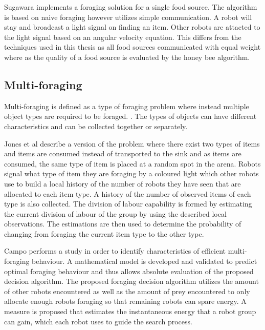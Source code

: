 Sugawara \cite{sugawara2002swarming} implements a foraging solution for a single food source. The algorithm is based on naive foraging however utilizes simple communication. A robot will stay and broadcast a light signal on finding an item. Other robots are attacted to the light signal based on an angular velocity equation. This differs from the techniques used in this thesis as all food sources communicated with equal weight where as the quality of a food source is evaluated by the honey bee algorithm.

\subsection{Multi-foraging}
Multi-foraging is defined as a type of foraging problem where instead  multiple object types are required to be foraged. \cite{Balch99rewardand}. The types of objects can have different characteristics and can be collected together or separately.



Jones et al \cite{jones2003adaptive} describe a version of the problem where there exist two types of items and items are consumed instead of transported to the sink and as items are consumed, the same type of item is placed at a random spot in the arena. Robots signal what type of item they are foraging by a coloured light which other robots use to build a local history of the number of robots they have seen that are allocated to each item type. A history of the number of observed items of each type is also collected. The division of labour capability is formed by estimating the current division of labour of the group by  using the described local observations. The estimations are then used to determine the probability of changing from foraging the current item type to the other type. 


Campo \cite{campo2007efficient} performs a study in order to identify characteristics of efficient multi-foraging behaviour.  A mathematical model is developed and validated to predict optimal foraging behaviour and thus allows absolute evaluation of the proposed decision algorithm. The proposed foraging decision algorithm utilizes the amount of other robots encountered as well as the amount of prey encountered to only allocate enough robots foraging  so that remaining robots can spare energy. A measure is proposed that estimates the instantaneous energy that a robot group can gain, which each robot uses to guide the search process. 

